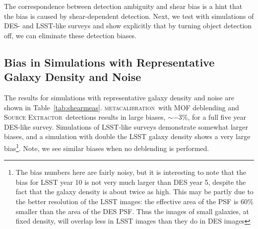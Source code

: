 \documentclass[iop, appendixfloats, numberedappendix, apj]{emulateapj}
\newcommand{\mcal}{\textsc{metacalibration}}
\newcommand{\sx}{\textsc{Source Extractor}}
\begin{document}
The correspondence between detection ambiguity and shear bias is a hint that
the bias is caused by shear-dependent detection. Next, we test with simulations
of DES- and LSST-like surveys and show explicitly that by turning object
detection off, we can eliminate these detection biases.


\subsection{Bias in Simulations with Representative Galaxy Density and Noise}

The results for simulations with representative galaxy density and noise are
shown in Table~\ref{tab:shearmeas}.  \mcal\ with MOF deblending and \sx\
detections results in large biases, $\sim-3\%$, for a full five year
DES-like survey. Simulations of LSST-like surveys demonstrate somewhat larger
biases, and a simulation with double the LSST galaxy density shows a very large
bias\footnote{The bias numbers here are fairly noisy, but it is interesting to
note that the bias for LSST year 10 is not very much larger than DES year 5,
despite the fact that the galaxy density is about twice as high.  This may be
partly due to the better resolution of the LSST images: the effective area
of the PSF is 60\% smaller than the area of the DES PSF.  Thus the images of
small galaxies, at fixed density, will overlap less in LSST images than they do
in DES images}.  Note, we see similar biases when no deblending is performed.
\end{document}
